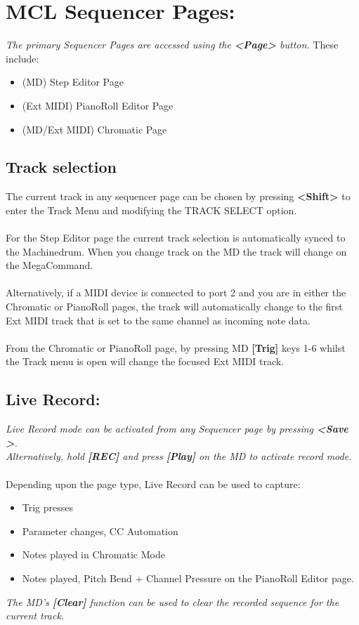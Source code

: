 \chapter{MCL Sequencer Pages:}

\textit{The primary Sequencer Pages are accessed using the \textbf{<Page>} button.} These include:
\begin{itemize}
    \item (MD) Step Editor Page
    \item (Ext MIDI) PianoRoll Editor Page
    \item (MD/Ext MIDI) Chromatic Page
\end{itemize}
\section{Track selection}
The current track in any sequencer page can be chosen by pressing \textbf{<Shift>} to enter the Track Menu and modifying the TRACK SELECT option.
\\\\
For the Step Editor page the current track selection is automatically synced to the Machinedrum. When you change track on the MD the track will change on the MegaCommand.\\\\
Alternatively, if a MIDI device is connected to port 2 and you are in either the Chromatic or PianoRoll pages, the track will automatically change to the first Ext MIDI track that is set to the same channel as incoming note data.\\\\
From the Chromatic or PianoRoll page, by pressing MD \textbf{[Trig]} keys 1-6 whilst the Track menu is open will change the focused Ext MIDI track.
\section{Live Record:}
\textit{Live Record mode can be activated from any Sequencer page by pressing \textbf{<Save >}.\\Alternatively, hold \textbf{[REC]} and press \textbf{[Play]} on the MD to activate record mode.}\\\\Depending upon the page type, Live Record can be used to capture:
\begin{itemize}
    \item Trig presses
    \item Parameter changes, CC Automation
    \item Notes played in Chromatic Mode
    \item Notes played, Pitch Bend + Channel Pressure on the PianoRoll Editor page.
\end{itemize}
\textit{The MD's \textbf{[Clear]} function can be used to clear the recorded sequence for the current track.}

